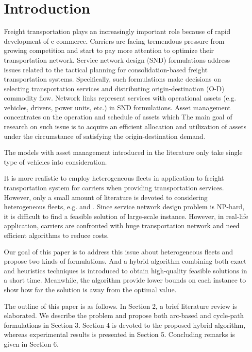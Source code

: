 \documentclass[11pt,nonblindrev,fleqn]{article}
\begin{document}
\section{Introduction}
Freight transportation plays an increasingly important role because of rapid development of e-commerce. Carriers are facing tremendous pressure from growing competition and start to pay more attention to optimize their transportation network. Service network design (SND) formulations address issues related to the tactical planning for consolidation-based freight transportation systems. Specifically, such formulations make decisions on selecting transportation services and distributing origin-destination (O-D) commodity flow.
Network links represent services with operational assets (e.g. vehicles, drivers, power units, etc.) in SND formulations. Asset management concentrates on the operation and schedule of assets which  The main goal of research on such issue is to acquire an efficient allocation and utilization of assets under the circumstance of satisfying the origin-destination demand.

The models with asset management introduced in the literature only take single type of vehicles into consideration.

It is more realistic to employ heterogeneous fleets in application to freight transportation system for carriers when providing transportation services. However, only a small amount of literature is devoted to considering heterogeneous fleets, e.g. \cite{Kim1999Multimodal} and \cite{Li2016Design}. Since service network design problem is NP-hard, it is difficult to find a feasible solution of large-scale instance. However, in real-life application, carriers are confronted with huge transportation network and need efficient algorithms to reduce costs.

Our goal of this paper is to address this issue about heterogeneous fleets and propose two kinds of formulations. And a hybrid algorithm combining both exact and heuristics techniques is introduced to obtain high-quality feasible solutions in a short time. Meanwhile, the algorithm provide lower bounds on each instance to show how far the solution is away from the optimal value.

The outline of this paper is as follows. In Section 2, a brief literature review is elaborated. We describe the problem and propose both arc-based and cycle-path formulations in Section 3. Section 4 is devoted to the proposed hybrid algorithm, whereas experimental results is presented in Section 5. Concluding remarks is given in Section 6.
\end{document}
